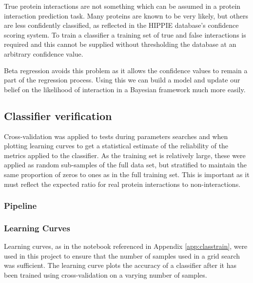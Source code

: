 True protein interactions are not something which can be assumed in a protein interaction prediction task.
Many proteins are known to be very likely, but others are less confidently classified, as reflected in the HIPPIE database's confidence scoring system\autocite{schaefer_hippie:_2012}.
To train a classifier a training set of true and false interactions is required and this cannot be supplied without thresholding the database at an arbitrary confidence value.

Beta regression avoids this problem as it allows the confidence values to remain a part of the regression process.
Using this we can build a model and update our belief on the likelihood of interaction in a Bayesian framework much more easily.

\subsection{Classifier verification}
\label{classifierverification}

%  


Cross-validation was applied to tests during parameters searches and when plotting learning curves to get a statistical estimate of the reliability of the metrics applied to the classifier\autocite[152]{witten_data_2011}.
As the training set is relatively large, these were applied as random sub-samples of the full data set, but stratified to maintain the same proportion of zeros to ones as in the full training set.
This is important as it must reflect the expected ratio for real protein interactions to non-interactions.

\subsubsection{Pipeline}


\subsubsection{Learning Curves}
Learning curves, as in the notebook referenced in Appendix \ref{app:classtrain}, were used in this project to ensure that the number of samples used in a grid search was sufficient.
The learning curve plots the accuracy of a classifier after it has been trained using cross-validation on a varying number of samples.

